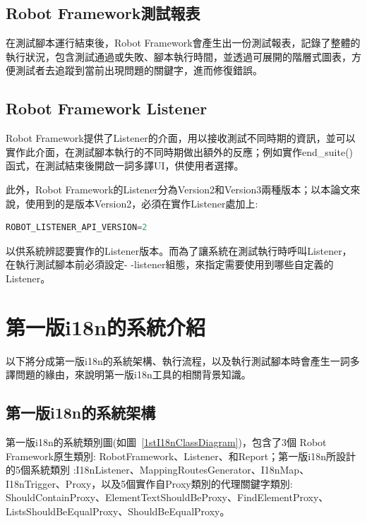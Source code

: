 \subsection{Robot Framework測試報表}
在測試腳本運行結束後，Robot Framework會產生出一份測試報表，記錄了整體的執行狀況，包含測試通過或失敗、腳本執行時間，並透過可展開的階層式圖表，方便測試者去追蹤到當前出現問題的關鍵字，進而修復錯誤。

\subsection{Robot Framework Listener}
Robot Framework提供了Listener\cite{rfguide}的介面，用以接收測試不同時期的資訊，並可以實作此介面，在測試腳本執行的不同時期做出額外的反應；例如實作end\_suite()函式，在測試結束後開啟一詞多譯UI，供使用者選擇。

此外，Robot Framework的Listener分為Version2和Version3兩種版本；以本論文來說，使用到的是版本Version2，必須在實作Listener處加上:
\begin{lstlisting}[language={python}]
ROBOT_LISTENER_API_VERSION=2
\end{lstlisting}
以供系統辨認要實作的Listener版本。而為了讓系統在測試執行時呼叫Listener，在執行測試腳本前必須設定- -listener組態，來指定需要使用到哪些自定義的Listener。

\section{第一版i18n的系統介紹}
以下將分成第一版i18n的系統架構、執行流程，以及執行測試腳本時會產生一詞多譯問題的緣由，來說明第一版i18n工具的相關背景知識。

\subsection{第一版i18n的系統架構}
第一版i18n的系統類別圖(如圖~\ref{1stI18nClassDiagram})，包含了3個 Robot Framework原生類別: RobotFramework、Listener、和Report；第一版i18n所設計的5個系統類別 :I18nListener、MappingRoutesGenerator、I18nMap、I18nTrigger、Proxy，以及5個實作自Proxy\cite{proxy}類別的代理關鍵字類別: ShouldContainProxy、ElementTextShouldBeProxy、FindElementProxy、ListsShouldBeEqualProxy、ShouldBeEqualProxy。\cite{i18n}

